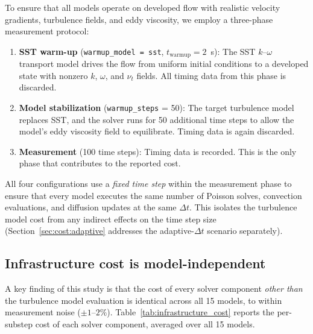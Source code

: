 To ensure that all models operate on developed flow with realistic velocity gradients, turbulence fields, and eddy viscosity, we employ a three-phase measurement protocol:
\begin{enumerate}
    \item \textbf{SST warm-up} (\texttt{warmup\_model = sst}, $t_\mathrm{warmup} = 2$~s): The SST $k$--$\omega$ transport model drives the flow from uniform initial conditions to a developed state with nonzero $k$, $\omega$, and $\nu_t$ fields. All timing data from this phase is discarded.
    \item \textbf{Model stabilization} (\texttt{warmup\_steps} = 50): The target turbulence model replaces SST, and the solver runs for 50 additional time steps to allow the model's eddy viscosity field to equilibrate. Timing data is again discarded.
    \item \textbf{Measurement} (100 time steps): Timing data is recorded. This is the only phase that contributes to the reported cost.
\end{enumerate}
All four configurations use a \emph{fixed time step} within the measurement phase to ensure that every model executes the same number of Poisson solves, convection evaluations, and diffusion updates at the same $\Delta t$.
This isolates the turbulence model cost from any indirect effects on the time step size (Section~\ref{sec:cost:adaptive} addresses the adaptive-$\Delta t$ scenario separately).

\subsection{Infrastructure cost is model-independent}
\label{sec:cost:infrastructure}

A key finding of this study is that the cost of every solver component \emph{other than} the turbulence model evaluation is identical across all 15 models, to within measurement noise ($\pm 1$--$2\%$).
Table~\ref{tab:infrastructure_cost} reports the per-substep cost of each solver component, averaged over all 15 models.

